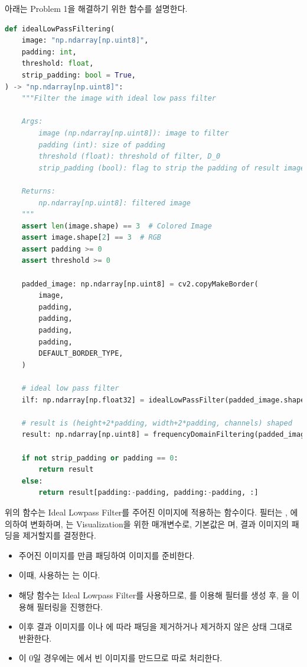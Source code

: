 \documentclass{report}
\begin{document}
아래는 Problem 1을 해결하기 위한 함수를 설명한다.

\begin{lstlisting}[language=Python, caption=idealLowPassFiltering, firstnumber=101]
def idealLowPassFiltering(
    image: "np.ndarray[np.uint8]",
    padding: int,
    threshold: float,
    strip_padding: bool = True,
) -> "np.ndarray[np.uint8]":
    """Filter the image with ideal low pass filter

    Args:
        image (np.ndarray[np.uint8]): image to filter
        padding (int): size of padding
        threshold (float): threshold of filter, D_0
        strip_padding (bool): flag to strip the padding of result image. Defaults to True

    Returns:
        np.ndarray[np.uint8]: filtered image
    """
    assert len(image.shape) == 3  # Colored Image
    assert image.shape[2] == 3  # RGB
    assert padding >= 0
    assert threshold >= 0

    padded_image: np.ndarray[np.uint8] = cv2.copyMakeBorder(
        image,
        padding,
        padding,
        padding,
        padding,
        DEFAULT_BORDER_TYPE,
    )

    # ideal low pass filter
    ilf: np.ndarray[np.float32] = idealLowPassFilter(padded_image.shape[:2], threshold)

    # result is (height+2*padding, width+2*padding, channels) shaped
    result: np.ndarray[np.uint8] = frequencyDomainFiltering(padded_image, ilf)

    if not strip_padding or padding == 0:
        return result
    else:
        return result[padding:-padding, padding:-padding, :]
\end{lstlisting}

위의 함수는 Ideal Lowpass Filter를 주어진 이미지에 적용하는 함수이다.
필터는 , 에 의하여 변화하며, 는 Visualization을 위한 매개변수로, 기본값은 며, 결과 이미지의 패딩을 제거할지를 결정한다.

\begin{itemize}
    \item 주어진 이미지를 만큼 패딩하여 이미지를 준비한다.
    \item 이때, 사용하는 는 이다.
    \item 해당 함수는 Ideal Lowpass Filter를 사용하므로, 를 이용해 필터를 생성 후, 을 이용해 필터링을 진행한다.
    \item 이후 결과 이미지를 이나 에 따라 패딩을 제거하거나 제거하지 않은 상태 그대로 반환한다.
    \item {}이 0일 경우에는 에서 빈 이미지를 만드므로 따로 처리한다.
\end{itemize}
\end{document}
